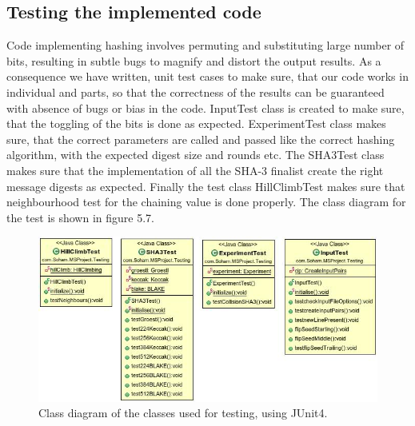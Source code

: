 \subsection{Testing the implemented code}

Code implementing hashing involves permuting and substituting large number of bits, resulting in subtle bugs to
magnify and distort the output results. As a consequence we have written, unit test cases to make sure, that our
code works in individual and parts, so that the correctness of the results can be guaranteed with absence of bugs
or bias in the code. InputTest class is created to make sure, that the toggling of the bits is done as expected.
ExperimentTest class makes sure, that the correct parameters are called and passed like the correct hashing
algorithm, with the expected digest size and rounds etc. The SHA3Test class makes sure that the implementation of 
all the SHA-3 finalist create the right message digests as expected. Finally the test class HillClimbTest makes
sure that neighbourhood test for the chaining value is done properly. The class diagram for the test is shown in
figure 5.7.

\begin{figure}
  \begin{center}
    \includegraphics[width=6.75in]{testingcode.jpg}
  \end{center}
  \caption{Class diagram of the classes used for testing, using JUnit4.}
  \label{fig:UMLJUnitTestClasses}
\end{figure}
